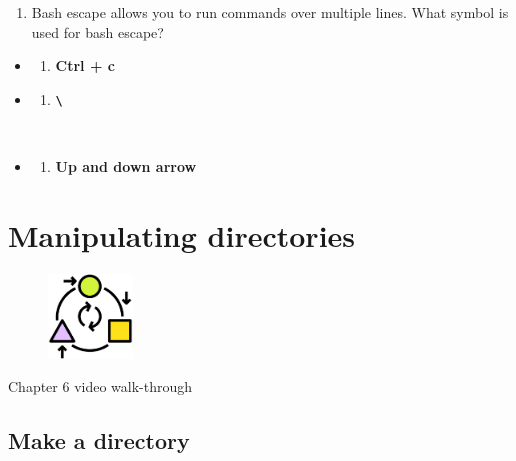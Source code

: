 \documentclass[
  letterpaper,
  DIV=11,
  numbers=noendperiod]{scrreprt}
\providecommand{\tightlist}{%
  \setlength{\itemsep}{0pt}\setlength{\parskip}{0pt}}\usepackage{longtable,booktabs,array}
\begin{document}
\begin{enumerate}
\def\labelenumi{\arabic{enumi}.}
\setcounter{enumi}{5}
\tightlist
\item
  Bash escape allows you to run commands over multiple lines. What
  symbol is used for bash escape?
\end{enumerate}

\begin{itemize}
\item
  \begin{enumerate}
  \def\labelenumi{(\Alph{enumi})}
  \tightlist
  \item
    \textbf{Ctrl + c}\\
  \end{enumerate}
\item
  \begin{enumerate}
  \def\labelenumi{(\Alph{enumi})}
  \setcounter{enumi}{1}
  \tightlist
  \item
    \textbf{\texttt{\textbackslash{}}}\strut \\
  \end{enumerate}
\item
  \begin{enumerate}
  \def\labelenumi{(\Alph{enumi})}
  \setcounter{enumi}{2}
  \tightlist
  \item
    \textbf{Up and down arrow}
  \end{enumerate}
\end{itemize}

\hypertarget{manipulatingdirectories}{%
\chapter{Manipulating directories}\label{manipulatingdirectories}}

\begin{figure}

{\centering \includegraphics[width=0.2\textwidth,height=\textheight]{figures/transform.png}

}

\end{figure}

Chapter 6 video walk-through

\hypertarget{make-a-directory}{%
\section{Make a directory}\label{make-a-directory}}
\end{document}
